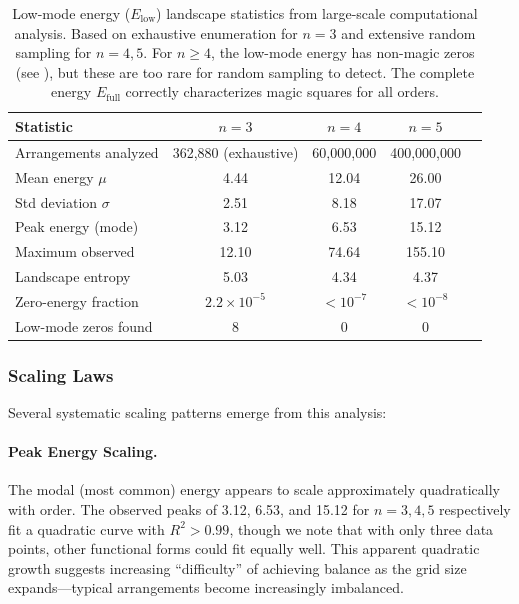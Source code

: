 \begin{table}[H]
\centering
\begin{tabular}{lcccc}
\toprule
Statistic & $n = 3$ & $n = 4$ & $n = 5$ \\
\midrule
Arrangements analyzed & 362,880 (exhaustive) & 60,000,000 & 400,000,000 \\
Mean energy $\mu$ & 4.44 & 12.04 & 26.00 \\
Std deviation $\sigma$ & 2.51 & 8.18 & 17.07 \\
Peak energy (mode) & 3.12 & 6.53 & 15.12 \\
Maximum observed & 12.10 & 74.64 & 155.10 \\
Landscape entropy & 5.03 & 4.34 & 4.37 \\
Zero-energy fraction & $2.2 \times 10^{-5}$ & $< 10^{-7}$ & $< 10^{-8}$ \\
Low-mode zeros found & 8 & 0 & 0 \\
\bottomrule
\end{tabular}
\caption{Low-mode energy ($E_{\mathrm{low}}$) landscape statistics from large-scale computational analysis.
Based on exhaustive enumeration for $n=3$ and extensive random sampling for $n=4,5$.
For $n \geq 4$, the low-mode energy has non-magic zeros (see ),
but these are too rare for random sampling to detect.
The complete energy $E_{\mathrm{full}}$ correctly characterizes magic squares for all orders.}
\label{tab:landscape_stats}
\end{table}

\subsubsection{Scaling Laws}

Several systematic scaling patterns emerge from this analysis:

\paragraph{Peak Energy Scaling.}
The modal (most common) energy appears to scale approximately quadratically with order.
The observed peaks of 3.12, 6.53, and 15.12 for $n=3,4,5$ respectively
fit a quadratic curve with $R^2 > 0.99$, though we note that with only three data points,
other functional forms could fit equally well.
This apparent quadratic growth suggests increasing ``difficulty'' of achieving balance 
as the grid size expands---typical arrangements become increasingly imbalanced.

